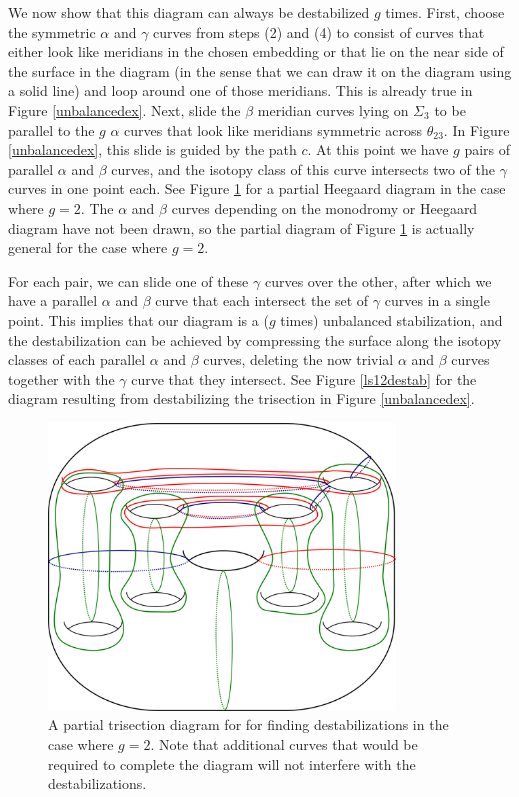 \documentclass[12pt]{amsart}
\theoremstyle{definition}
\theoremstyle{remark}
\begin{document}
We now show that this diagram can always be destabilized $g$ times.
First, choose the symmetric $\alpha$ and $\gamma$ curves from steps (2) and (4) to consist of curves that either look like meridians in the chosen embedding or that lie on the near side of the surface in the diagram (in the sense that we can draw it on the diagram using a solid line) and loop around one of those meridians.
 This is already true in Figure \ref{unbalancedex}.
Next, slide the $\beta$ meridian curves lying on $\Sigma_3$ to be parallel to the $g$ $\alpha$ curves that look like meridians symmetric across $\theta_{23}$.
In Figure \ref{unbalancedex}, this slide is guided by the path $c$.
At this point we have $g$ pairs of parallel $\alpha$ and $\beta$ curves, and the isotopy class of this curve intersects two of the $\gamma$ curves in one point each.
See Figure \ref{destabpartial} for a partial Heegaard diagram in the case where $g=2$.
The $\alpha$ and $\beta$ curves depending on the monodromy or Heegaard diagram have not been drawn, so the partial diagram of Figure \ref{destabpartial} is actually general for the case where $g=2$.

For each pair, we can slide one of these $\gamma$ curves over the other, after which we have a parallel $\alpha$ and $\beta$ curve that each intersect the set of $\gamma$ curves in a single point.
This implies that our diagram is a ($g$ times) unbalanced stabilization, and the destabilization can be achieved by compressing the surface along the isotopy classes of each parallel $\alpha$ and $\beta$ curves, deleting the now trivial $\alpha$ and $\beta$ curves together with the $\gamma$ curve that they intersect.
See Figure \ref{ls12destab} for the diagram resulting from destabilizing the trisection in Figure \ref{unbalancedex}.


\begin{figure}[h]
\centering
\includegraphics[height=3in]{finddestabpartial.png}
\caption{A partial trisection diagram for for finding destabilizations in the case where $g=2$.
Note that additional curves that would be required to complete the diagram will not interfere with the destabilizations.}
\label{destabpartial}
\end{figure}
\end{document}

